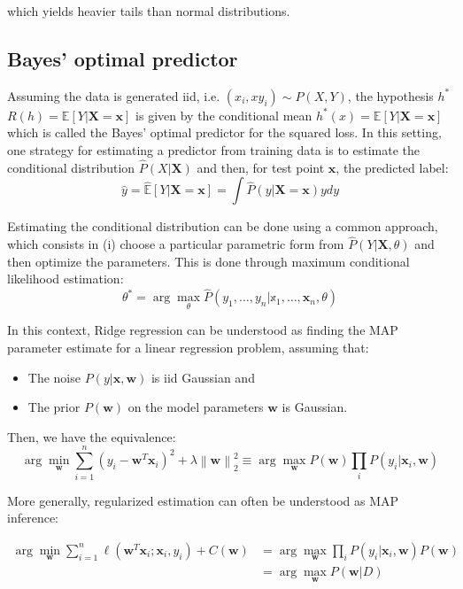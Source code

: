 \documentclass[a4paper,10pt,twoside]{article}
\newcommand\norm[1]{\left\lVert#1\right\rVert}
\begin{document}
which yields heavier tails than normal distributions.

\subsection{Bayes' optimal predictor}

Assuming the data is generated iid, i.e. $(x_i, xy_i)\sim P(X,Y)$, the hypothesis $h^*$ $R(h) = \mathbb{E}[Y|\mathbf{X}=\mathbf{x}]$ is given by the conditional mean $h^*(x)=\mathbb{E}[Y|\mathbf{X}=\mathbf{x}]$ which is called the Bayes' optimal predictor for the squared loss. In this setting, one strategy for estimating a predictor from training data is to estimate the conditional distribution $\hat{P}(X|\mathbf{X})$ and then, for test point $\mathbf{x}$, the predicted label:
\begin{equation*}
  \hat{y} = \mathbb{\hat{E}}[Y|\mathbf{X}=\mathbf{x}] = \int\hat{P}(y|\mathbf{X}=\mathbf{x})ydy
\end{equation*}

Estimating the conditional distribution can be done using a common approach, which consists in (i) choose a particular parametric form from $\hat{P}(Y|\mathbf{X},\theta)$ and then optimize the parameters. This is done through maximum conditional likelihood estimation:
\begin{equation*}
  \theta^*=\arg\max_{\theta}\hat{P}(y_1,\ldots,y_n|\mathbb{x}_1,\ldots, \mathbf{x}_n,\theta)
\end{equation*}

In this context, Ridge regression can be understood as finding the MAP parameter estimate for a linear regression problem, assuming that:
\begin{itemize}
\item The noise $P(y|\mathbf{x},\mathbf{w})$ is iid Gaussian and
  \item The prior $P(\mathbf{w})$ on the model parameters $\mathbf{w}$ is Gaussian.
\end{itemize}

Then, we have the equivalence:
\begin{equation*}
  \arg\min_{\mathbf{w}}\sum_{i=1}^{n}(y_i-\mathbf{w}^T\mathbf{x}_i)^2 + \lambda\norm{\mathbf{w}}_2^2 \equiv\arg\max_{\mathbf{w}}P(\mathbf{w})\prod_iP(y_i|\mathbf{x}_i, \mathbf{w})
\end{equation*}

More generally, regularized estimation can often be understood as MAP inference:

\begin{align*}
  \arg\min_{\mathbf{w}}\sum_{i=1}^{n}\ell(\mathbf{w}^T\mathbf{x}_i;\mathbf{x}_i,y_i) + C(\mathbf{w}) &= \arg\max_{\mathbf{w}}\prod_i P(y_i|\mathbf{x}_i,\mathbf{w})P(\mathbf{w})\\
  &= \arg\max_{\mathbf{w}}P(\mathbf{w}|D)
\end{align*}
\end{document}
